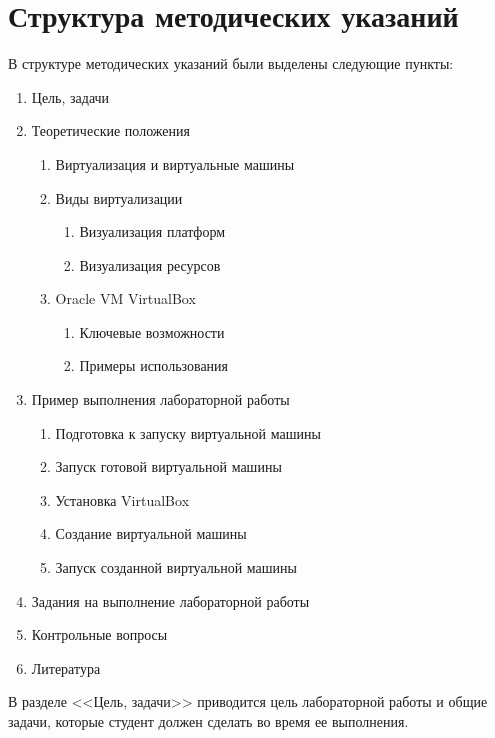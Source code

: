 \documentclass[a4paper, 14pt]{extreport}
\begin{document}
    \chapter{Структура методических указаний}
    В структуре методических указаний были выделены следующие пункты:
    \begin{enumerate}
        \item Цель, задачи
        \item Теоретические положения
        \begin{enumerate}
            \item Виртуализация и виртуальные машины
            \item Виды виртуализации
            \begin{enumerate}
                \item Визуализация платформ
                \item Визуализация ресурсов
            \end{enumerate}
            \item Oracle VM VirtualBox
            \begin{enumerate}
                \item Ключевые возможности
                \item Примеры использования
            \end{enumerate}
        \end{enumerate}
        \item Пример выполнения лабораторной работы
        \begin{enumerate}
            \item Подготовка к запуску виртуальной машины
            \item Запуск готовой виртуальной машины
            \item Установка VirtualBox
            \item Создание виртуальной машины
            \item Запуск созданной виртуальной машины
        \end{enumerate}
        \item Задания на выполнение лабораторной работы
        \item Контрольные вопросы
        \item Литература
    \end{enumerate}

    \newpage

    В разделе <<Цель, задачи>> приводится цель лабораторной работы и общие
    задачи, которые студент должен сделать во время ее выполнения.
\end{document}
